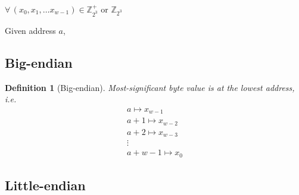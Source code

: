 \documentclass[10pt]{amsart}
\newtheorem{definition}{Definition}
\begin{document}
$\forall \, (x_0, x_1, \dots x_{w-1}) \in \mathbb{Z}^+_{2^3} \text{ or } \mathbb{Z}_{2^3}$

Given address $a$, 

\subsection{Big-endian}

\begin{definition}[Big-endian]
	Most-significant byte value is at the lowest address, i.e. 
	\begin{equation}
	\begin{gathered}
	a \mapsto x_{w-1} \\
	a+1 \mapsto x_{w-2} \\ 
	a+2 \mapsto x_{w-3} \\ 
	\vdots \\
	a+w - 1 \mapsto x_0 
	\end{gathered}
	\end{equation}
\end{definition} 

\subsection{Little-endian}
\end{document}
